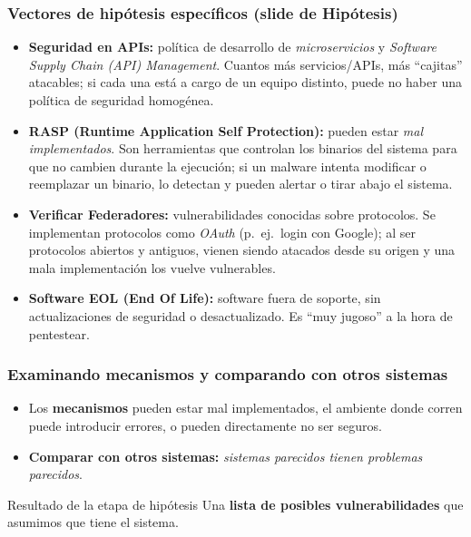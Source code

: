 \documentclass[11pt,a4paper]{article}
\begin{document}
\subsubsection*{Vectores de hipótesis específicos (slide de Hipótesis)}
\begin{itemize}[leftmargin=1.6em,itemsep=3pt]
  \item \textbf{Seguridad en APIs:} política de desarrollo de \emph{microservicios} y
        \emph{Software Supply Chain (API) Management}. Cuantos más servicios/APIs, más
        ``cajitas'' atacables; si cada una está a cargo de un equipo distinto, puede no haber
        una política de seguridad homogénea.
  \item \textbf{RASP (Runtime Application Self Protection):} pueden estar \emph{mal
        implementados}. Son herramientas que controlan los binarios del sistema para que no
        cambien durante la ejecución; si un malware intenta modificar o reemplazar un binario,
        lo detectan y pueden alertar o tirar abajo el sistema.
  \item \textbf{Verificar Federadores:} vulnerabilidades conocidas sobre protocolos. Se
        implementan protocolos como \emph{OAuth} (p.\ ej.\ login con Google); al ser
        protocolos abiertos y antiguos, vienen siendo atacados desde su origen y una mala
        implementación los vuelve vulnerables.
  \item \textbf{Software EOL (End Of Life):} software fuera de soporte, sin actualizaciones de
        seguridad o desactualizado. Es ``muy jugoso'' a la hora de pentestear.
\end{itemize}

\subsubsection*{Examinando mecanismos y comparando con otros sistemas}
\begin{itemize}[leftmargin=1.6em,itemsep=2pt]
  \item Los \textbf{mecanismos} pueden estar mal implementados, el ambiente donde corren puede
        introducir errores, o pueden directamente no ser seguros.
  \item \textbf{Comparar con otros sistemas:} \emph{sistemas parecidos tienen problemas
        parecidos}.
\end{itemize}

\begin{defbox}{Resultado de la etapa de hipótesis}
Una \textbf{lista de posibles vulnerabilidades} que asumimos que tiene el sistema.
\end{defbox}
\end{document}
